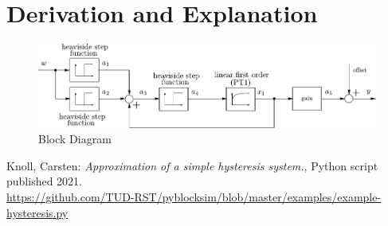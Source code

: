 \documentclass[10pt,a4paper]{article}
\begin{document}
	\section{Derivation and Explanation} %
	\begin{figure}[H]
		\centering
		\includegraphics[width=120mm]{hysteresis_block.pdf}
		\caption{Block Diagram}
	\end{figure}



	\begin{thebibliography}{10}
		Knoll, Carsten:
		\textit{Approximation of a simple hysteresis system.}, Python script published 2021. \\
		\url{https://github.com/TUD-RST/pyblocksim/blob/master/examples/example-hysteresis.py}
	\end{thebibliography}
\end{document}
